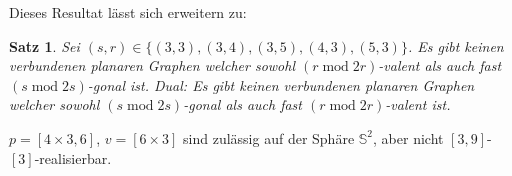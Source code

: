 \documentclass[10pt, notheorems]{beamer}
\newtheorem{theorem}{Satz}[section]
\newcommand{\set}[1]{\{ #1 \}}
\newcommand{\sphere}{\mathbb{S}}
\renewcommand{\mod}{\operatorname{mod}}
\begin{document}
\begin{frame}
  Dieses Resultat lässt sich erweitern zu:
  \begin{theorem}
    Sei $(s, r) \in \set{(3, 3), (3, 4), (3, 5), (4, 3), (5, 3)}$. Es gibt keinen verbundenen planaren Graphen welcher sowohl $(r \mod 2r)$-valent als auch fast $(s \mod 2s)$-gonal ist. Dual: Es gibt keinen verbundenen planaren Graphen welcher sowohl $(s \mod 2s)$-gonal als auch fast $(r \mod 2r)$-valent ist. 
  \end{theorem}

  \begin{example}
    $p = [4 \times 3, 6]$, $v = [6 \times 3]$ sind zulässig auf der Sphäre $\sphere^2$, aber nicht $[3, 9]$-$[3]$-realisierbar.
  \end{example}
\end{frame}
\end{document}
